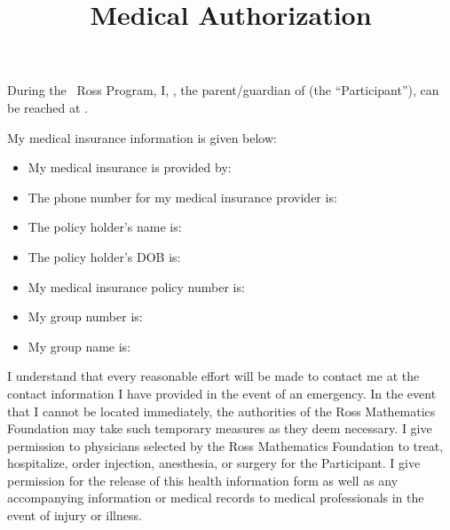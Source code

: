 \documentclass{ross}
\title{Medical Authorization}
\begin{document}
\maketitle


During the \the\year\ Ross Program, I, , 
the parent/guardian of  (the ``Participant''), 
can be reached at .

My medical insurance information is given below:
\begin{itemize}
  \item My medical insurance is provided by: \hfill {}
  \item The phone number for my medical insurance provider is: \hfill {}
  \item The policy holder's name is: \hfill {}
  \item The policy holder's DOB is: \hfill \genblank[birthday]{\phantom{\hspace{1.5in}}}
  \item My medical insurance policy number is: \hfill {}
  \item My group number is: \hfill {}
  \item My group name is: \hfill {}
\end{itemize}

I understand that every reasonable effort will be made to contact me
at the contact information I have provided in the event of an
emergency.  In the event that I cannot be located immediately, the
authorities of the Ross Mathematics Foundation may take such temporary
measures as they deem necessary.  I give permission to physicians selected by the Ross Mathematics Foundation to treat, hospitalize, order injection, anesthesia, or surgery for the Participant.  I give permission for the release of this health information form as well as any accompanying information or medical records to medical professionals in the event of injury or illness.
\end{document}
